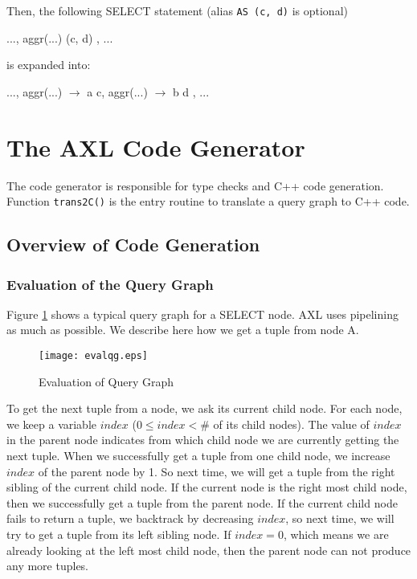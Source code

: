 Then, the following SELECT statement (alias {\tt AS (c, d)} is
optional)

\begin{codedisplay}
 ..., aggr(...)  (c, d) , ...
\end{codedisplay}

is expanded into:

\begin{codedisplay}
 ..., aggr(...) $\rightarrow$ a  c, aggr(...) $\rightarrow$ b  d , ...
\end{codedisplay}


\section{The AXL Code Generator}
The code generator is responsible for type checks and C++ code
generation. Function {\tt trans2C()} is the entry routine to translate
a query graph to C++ code.

\subsection{Overview of Code Generation\label{sec:cgoverview}}

\subsubsection*{Evaluation of the Query Graph}
Figure \ref{fig:evalqg} shows a typical query graph for a SELECT node.
AXL uses pipelining as much as possible. We describe here how we get a
tuple from node A.

\begin{figure}[!htb]
\centering
\texttt{[image: evalqg.eps]}
\caption{Evaluation of Query Graph}
\label{fig:evalqg}
\end{figure}

To get the next tuple from a node, we ask its current child node. For
each node, we keep a variable $index$ ($0 \le index < $\# of its child
nodes). The value of $index$ in the parent node indicates from which
child node we are currently getting the next tuple.  When we
successfully get a tuple from one child node, we increase $index$ of
the parent node by 1. So next time, we will get a tuple from the right
sibling of the current child node. If the current node is the right
most child node, then we successfully get a tuple from the parent
node. If the current child node fails to return a tuple, we backtrack
by decreasing $index$, so next time, we will try to get a tuple from
its left sibling node. If $index=0$, which means we are already
looking at the left most child node, then the parent node can not
produce any more tuples.

